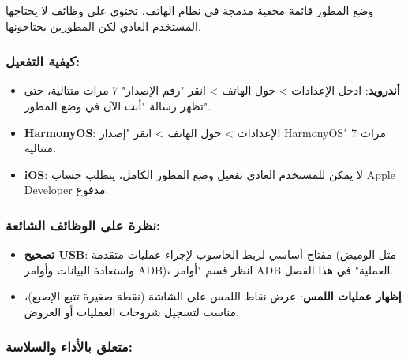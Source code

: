 


وضع المطور قائمة مخفية مدمجة في نظام الهاتف، تحتوي على وظائف لا يحتاجها المستخدم العادي لكن المطورين يحتاجونها.

\subsubsection*{كيفية التفعيل:}

\begin{itemize}
  \item \textbf{أندرويد}: ادخل الإعدادات > حول الهاتف > انقر "رقم الإصدار" 7 مرات متتالية، حتى تظهر رسالة "أنت الآن في وضع المطور".
  \item \textbf{HarmonyOS}: الإعدادات > حول الهاتف > انقر "إصدار HarmonyOS" 7 مرات متتالية.
  \item \textbf{iOS}: لا يمكن للمستخدم العادي تفعيل وضع المطور الكامل، يتطلب حساب Apple Developer مدفوع.
\end{itemize}

\subsubsection*{نظرة على الوظائف الشائعة:}

\begin{itemize}
  \item \textbf{تصحيح USB}: مفتاح أساسي لربط الحاسوب لإجراء عمليات متقدمة (مثل الوميض واستعادة البيانات وأوامر ADB)، انظر قسم "أوامر ADB العملية" في هذا الفصل.
  \item \textbf{إظهار عمليات اللمس}: عرض نقاط اللمس على الشاشة (نقطة صغيرة تتبع الإصبع)، مناسب لتسجيل شروحات العمليات أو العروض.
\end{itemize}

\subsubsection*{متعلق بالأداء والسلاسة:}

